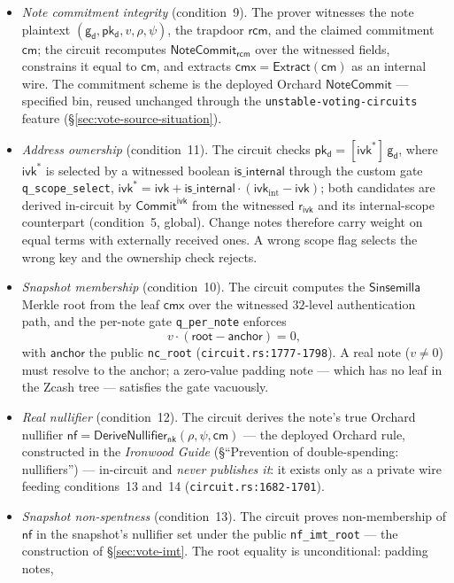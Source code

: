 \documentclass[11pt,a4paper]{article}
\theoremstyle{definition}
\newcommand{\nfsym}{\mathsf{nf}}
\newcommand{\cmsym}{\mathsf{cm}}
\newcommand{\cmx}{\mathsf{cmx}}
\newcommand{\NoteCommit}{\ensuremath{\mathsf{NoteCommit}}}
\newcommand{\Sinsemilla}{\ensuremath{\mathsf{Sinsemilla}}}
\newcommand{\CommitIvk}{\ensuremath{\mathsf{Commit}^{\mathsf{ivk}}}}
\newcommand{\Extract}{\ensuremath{\mathsf{Extract}}}
\newcommand{\nksym}{\ensuremath{\mathsf{nk}}}
\newcommand{\ivk}{\ensuremath{\mathsf{ivk}}}
\newcommand{\pkd}{\ensuremath{\mathsf{pk_d}}}
\newcommand{\gd}{\ensuremath{\mathsf{g_d}}}
\newcommand{\rcm}{\ensuremath{\mathsf{rcm}}}
\newcommand{\rivk}{\ensuremath{\mathsf{r_{ivk}}}}
\begin{document}
\begin{itemize}
\item \emph{Note commitment integrity} (condition~9). The prover witnesses
  the note plaintext $(\gd, \pkd, v, \rho, \psi)$, the trapdoor $\rcm$, and
  the claimed commitment $\cmsym$; the circuit recomputes
  $\NoteCommit_{\rcm}$ over the witnessed fields, constrains it equal to
  $\cmsym$, and extracts $\cmx = \Extract(\cmsym)$ as an internal wire. The
  commitment scheme is the deployed Orchard \NoteCommit{} --- specified
  bin, reused unchanged through the \texttt{unstable-voting-circuits}
  feature (\S\ref{sec:vote-source-situation}).
\item \emph{Address ownership} (condition~11). The circuit checks
  $\pkd = [\ivk^{*}]\,\gd$, where $\ivk^{*}$ is selected by a witnessed
  boolean $\mathsf{is\_internal}$ through the custom gate
  \texttt{q\_scope\_select},
  $\ivk^{*} = \ivk + \mathsf{is\_internal}\cdot(\ivk_{\mathrm{int}} - \ivk)$;
  both candidates are derived in-circuit by \CommitIvk{} from the witnessed
  $\rivk$ and its internal-scope counterpart (condition~5, global). Change
  notes therefore carry weight on equal terms with externally received
  ones. A wrong scope flag selects the wrong key and the ownership check
  rejects.
\item \emph{Snapshot membership} (condition~10). The circuit computes the
  \Sinsemilla{} Merkle root from the leaf $\cmx$ over the witnessed
  $32$-level authentication path, and the per-note gate
  \texttt{q\_per\_note} enforces
  \[
    v \cdot (\mathsf{root} - \mathsf{anchor}) = 0,
  \]
  with $\mathsf{anchor}$ the public \texttt{nc\_root}
  (\texttt{circuit.rs:1777-1798}). A real note ($v \neq 0$) must resolve to
  the anchor; a zero-value padding note --- which has no leaf in the Zcash
  tree --- satisfies the gate vacuously.
\item \emph{Real nullifier} (condition~12). The circuit derives the note's
  true Orchard nullifier
  $\nfsym = \mathsf{DeriveNullifier}_{\nksym}(\rho, \psi, \cmsym)$ --- the
  deployed Orchard rule, constructed in the \emph{Ironwood Guide}
  (\S``Prevention of double-spending: nullifiers'') --- in-circuit and
  \emph{never publishes it}: it exists only as a private wire feeding
  conditions~13 and~14 (\texttt{circuit.rs:1682-1701}).
\item \emph{Snapshot non-spentness} (condition~13). The circuit proves
  non-membership of $\nfsym$ in the snapshot's nullifier set under the
  public \texttt{nf\_imt\_root} --- the construction of
  \S\ref{sec:vote-imt}. The root equality is unconditional: padding notes,

\end{itemize}
\end{document}
